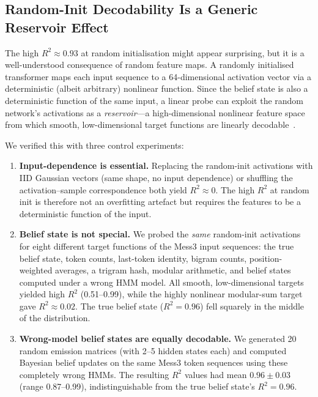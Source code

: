 \documentclass[11pt]{article}
\begin{document}
\subsection{Random-Init Decodability Is a Generic Reservoir Effect}
\label{sec:reservoir}

The high $R^2 \approx 0.93$ at random initialisation might appear surprising, but it is a well-understood consequence of random feature maps.  A randomly initialised transformer maps each input sequence to a 64-dimensional activation vector via a deterministic (albeit arbitrary) nonlinear function.  Since the belief state is also a deterministic function of the same input, a linear probe can exploit the random network's activations as a \emph{reservoir}---a high-dimensional nonlinear feature space from which smooth, low-dimensional target functions are linearly decodable~\cite{rahimi2007random,reservoir_transformers}.

We verified this with three control experiments:
\begin{enumerate}
  \item \textbf{Input-dependence is essential.}  Replacing the random-init activations with IID Gaussian vectors (same shape, no input dependence) or shuffling the activation--sample correspondence both yield $R^2 \approx 0$.  The high $R^2$ at random init is therefore not an overfitting artefact but requires the features to be a deterministic function of the input.

  \item \textbf{Belief state is not special.}  We probed the \emph{same} random-init activations for eight different target functions of the Mess3 input sequences: the true belief state, token counts, last-token identity, bigram counts, position-weighted averages, a trigram hash, modular arithmetic, and belief states computed under a wrong HMM model.  All smooth, low-dimensional targets yielded high $R^2$ (0.51--0.99), while the highly nonlinear modular-sum target gave $R^2 \approx 0.02$.  The true belief state ($R^2 = 0.96$) fell squarely in the middle of the distribution.

  \item \textbf{Wrong-model belief states are equally decodable.}  We generated 20 random emission matrices (with 2--5 hidden states each) and computed Bayesian belief updates on the same Mess3 token sequences using these completely wrong HMMs.  The resulting $R^2$ values had mean $0.96 \pm 0.03$ (range 0.87--0.99), indistinguishable from the true belief state's $R^2 = 0.96$.
\end{enumerate}
\end{document}
